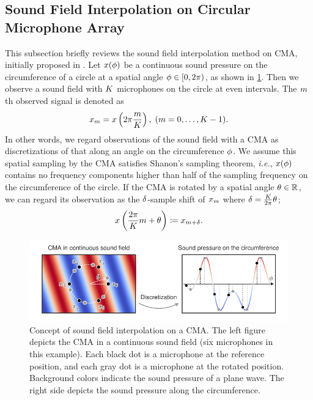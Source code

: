 \documentclass[sip,biber]{now-journal}
\begin{document}
\subsection{Sound Field Interpolation on Circular Microphone Array}
This subsection briefly reviews the sound field interpolation method on CMA, initially proposed in \cite{Wakabayashi:2021:ICASSP,Wakabayashi:2023:ASLP}.
Let $x (\phi)$ be a continuous sound pressure on the circumference of a circle at a spatial angle $\rotCoor \in \interval[open right,soft open fences]{0}{2\pi}$, as shown in \cref{fig:sfi}.
Then we observe a sound field with $K$ microphones on the circle at even intervals.
The $m$th observed signal is denoted as
\begin{equation}
  \sfcma _{\mic} = \sfcma \left(2\pi \frac{\mic}{\Mic}\right),\; (\mic = 0, \dots, \Mic - 1).%
  \label{eq:sfi:model}
\end{equation}
In other words, we regard observations of the sound field with a CMA as discretizations of that along an angle on the circumference $\phi$.
We assume this spatial sampling by the CMA satisfies Shanon's sampling theorem, \emph{i.e.}, $x (\phi)$ contains no frequency components higher than half of the sampling frequency on the circumference of the circle.
If the CMA is rotated by a spatial angle $\theta \in \mathbb{R}$, we can regard its observation as the $\delta$-sample shift of $x _{m}$ where $\delta = \frac{K}{2\pi} \theta$;
\begin{equation}
  \sfcma \left(\frac{2\pi}{\Mic} \mic + \rotSpat \right)%
  \coloneqq
  \sfcma _{\mic + \rotSmpl}.
  \label{eq:sfi:shift:obs}
\end{equation}
\begin{figure}[t]
  \centering
  \includegraphics{figures/diagrams/sfi.pdf}
  \caption{%
    Concept of sound field interpolation on a CMA.
    The left figure depicts the CMA in a continuous sound field (six microphones in this example).
    Each black dot is a microphone at the reference position, and each gray dot is a microphone at the rotated position.
    Background colors indicate the sound pressure of a plane wave.
    The right side depicts the sound pressure along the circumference.
  }%
  \label{fig:sfi}
\end{figure}
\end{document}
